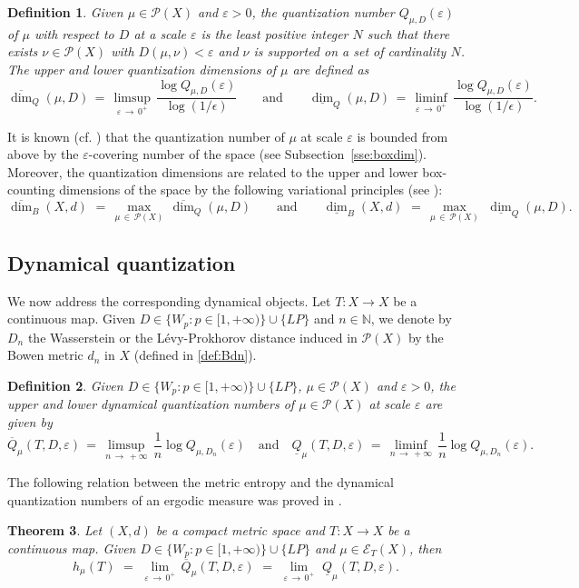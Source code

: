 \documentclass[11pt,a4paper,reqno]{amsart}
\theoremstyle{plain}
\newtheorem{theorem}{Theorem}[section]
\theoremstyle{definition}
\newtheorem{definition}[theorem]{Definition}
\newcommand{\ep} {\varepsilon}
\newcommand{\vep}{\varepsilon}
\newcommand{\cP}{{\mathcal P}}
\newcommand{\cE}{{\mathcal E}}
\begin{document}
\begin{definition}\label{def:qnumber}
\emph{Given $\mu\in\cP(X)$ and $\vep > 0$, the \emph{quantization number $Q_{\mu,D}(\ep)$ of $\mu$ with respect to $D$ at a scale $\vep$} is the least positive integer $N$ such that there exists $\nu\in\cP(X)$ with $D(\mu, \nu) < \vep$ and $\nu$ is supported on a set of cardinality $N$. The \emph{upper} and \emph{lower quantization dimensions of $\mu$} are defined as $$\overline{\dim}_Q(\mu,D)\,=\,\limsup_{\ep\,\to\,0^+}\,\frac{\log Q_{\mu,D}(\ep)}{\log(1/\epsilon)}\qquad\text{and}\qquad\underline{\dim}_Q(\mu,D)\,=\,\liminf_{\ep\,\to\,0^+}\,\frac{\log Q_{\mu,D}(\ep)}{\log(1/\epsilon)}.$$}
\end{definition}
\smallskip
It is known (cf. \cite[Proposition~3.4]{BB}) that the quantization number of $\mu$ at scale $\ep$ is bounded from above by the $\ep$-covering number of the space (see Subsection~\ref{sse:boxdim}). Moreover, the quantization dimensions are related to the upper and lower box-counting dimensions of the space by the following variational principles (see \cite[Proof of Theorem~3.9]{BB}): 
\begin{equation}\label{dimB_VP}
\overline{\dim}_B(X,d)\,\,=\,\max_{\mu\,\in\,\cP(X)}\,\overline{\dim}_Q(\mu,D)\qquad\text{and}\qquad \underline{\dim}_B(X,d)\,\,=\,\max_{\mu\,\in\,\cP(X)}\,\,\underline{\dim}_Q(\mu,D).
\end{equation}

\smallskip

\subsection{Dynamical quantization}\label{sse:meanQ}

We now address the corresponding dynamical objects. Let $T\colon X\to X$ be a continuous map. Given $D \in \{W_p\colon p \in [1,+\infty)\}\cup \{LP\}$ and $n \in \mathbb{N}$, we denote by $D_n$ the Wasserstein or the L\'evy-Prokhorov distance induced in $\cP(X)$ by the Bowen metric $d_n$ in $X$ (defined in \eqref{def:Bdn}).
\smallskip

\begin{definition} 
\emph{Given $D \in \{W_p\colon p \in [1,+\infty)\}\cup 
\{LP\}$, $\mu\in\cP(X)$ and $\vep > 0$, the \emph{upper} and \emph{lower dynamical quantization numbers of $\mu\in\cP(X)$ at scale $\ep$} are given by 
$$\overline{Q}_\mu(T,D,\ep)\,=\,\limsup_{n\,\to\,+\infty}\,\frac{1}{n}
\log Q_{\mu,D_n}(\ep)
\quad\text{and}\quad
\underline{Q}_\mu(T,D,\ep)\,=\,\liminf_{n\,\to\,+\infty}\,\frac{1}{n}\log Q_{\mu,D_n}(\ep).$$}
\end{definition}
\smallskip
The following relation between the metric entropy and the dynamical quantization numbers of an ergodic measure was proved in \cite{BB}.
\smallskip
\begin{theorem}\cite[Appendix A.3]{BB}\label{teo:BB}
Let $(X,d)$ be a compact metric space and $T\colon X\to X$ be a continuous map. Given $D \in \{W_p\colon p \in [1,+\infty)\}\cup \{LP\}$ and $\mu \in \cE_T(X)$, then
$$h_\mu(T) \,\,=\,\, \lim_{\ep\,\to\,0^+}\,\overline{Q}_\mu(T,D,\ep)\,\,=\,\, \lim_{\ep\,\to\,0^+}\,\,\underline{Q}_\mu(T,D,\ep).$$
\end{theorem}
\end{document}
